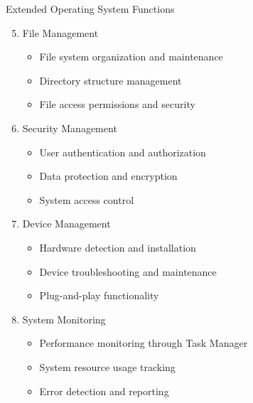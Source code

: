 \documentclass[aspectratio=169]{beamer}
\begin{document}
\begin{frame}{Extended Operating System Functions}
    \begin{enumerate}
        \setcounter{enumi}{4}
        \item File Management
        \begin{itemize}
            \item File system organization and maintenance
            \item Directory structure management
            \item File access permissions and security
        \end{itemize}
        
        \item Security Management
        \begin{itemize}
            \item User authentication and authorization
            \item Data protection and encryption
            \item System access control
        \end{itemize}
        
        \item Device Management
        \begin{itemize}
            \item Hardware detection and installation
            \item Device troubleshooting and maintenance
            \item Plug-and-play functionality
        \end{itemize}
        
        \item System Monitoring
        \begin{itemize}
            \item Performance monitoring through Task Manager
            \item System resource usage tracking
            \item Error detection and reporting
        \end{itemize}
    \end{enumerate}
\end{frame}
\end{document}
